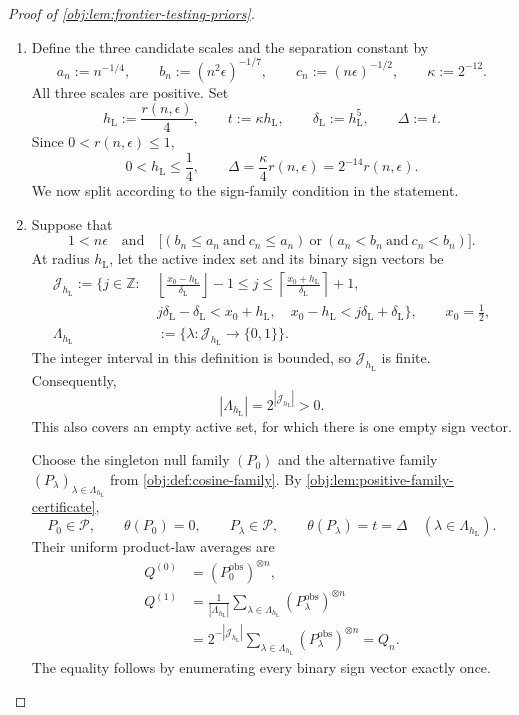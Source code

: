 \begin{proof}[Proof of \cref{obj:lem:frontier-testing-priors}]
\begin{enumerate}
\item Define the three candidate scales and the separation constant by
\[
a_n:=n^{-1/4},\qquad
b_n:=(n^2\epsilon)^{-1/7},\qquad
c_n:=(n\epsilon)^{-1/2},\qquad
\kappa:=2^{-12}.
\]
All three scales are positive. Set
\[
h_{\mathrm L}:=\frac{r(n,\epsilon)}4,\qquad
t:=\kappa h_{\mathrm L},\qquad
\delta_{\mathrm L}:=h_{\mathrm L}^{5},\qquad
\Delta:=t.
\]
Since \(0<r(n,\epsilon)\le1\),
\[
0<h_{\mathrm L}\le\frac14,
\qquad
\Delta=\frac{\kappa}{4}r(n,\epsilon)
      =2^{-14}r(n,\epsilon).
\]
We now split according to the sign-family condition in the statement.

\item Suppose that
\[
1<n\epsilon
\quad\text{and}\quad
\bigl[(b_n\le a_n\ \text{and}\ c_n\le a_n)
\ \text{or}\
(a_n<b_n\ \text{and}\ c_n<b_n)\bigr].
\]
At radius \(h_{\mathrm L}\), let the active index set and its binary sign vectors be
\[
\begin{aligned}
\mathcal J_{h_{\mathrm L}}
:=\biggl\{j\in\mathbb Z:\;&
\left\lfloor\frac{x_0-h_{\mathrm L}}{\delta_{\mathrm L}}\right\rfloor-1
\le j\le
\left\lceil\frac{x_0+h_{\mathrm L}}{\delta_{\mathrm L}}\right\rceil+1,\\
&j\delta_{\mathrm L}-\delta_{\mathrm L}<x_0+h_{\mathrm L},
\quad
x_0-h_{\mathrm L}<j\delta_{\mathrm L}+\delta_{\mathrm L}
\biggr\},
\qquad x_0=\frac12,\\
\Lambda_{h_{\mathrm L}}&:=\{\lambda:\mathcal J_{h_{\mathrm L}}\to\{0,1\}\}.
\end{aligned}
\]
The integer interval in this definition is bounded, so \(\mathcal J_{h_{\mathrm L}}\) is finite. Consequently,
\[
|\Lambda_{h_{\mathrm L}}|=2^{|\mathcal J_{h_{\mathrm L}}|}>0.
\]
This also covers an empty active set, for which there is one empty sign vector.

Choose the singleton null family \((P_0)\) and the alternative family
\((P_\lambda)_{\lambda\in\Lambda_{h_{\mathrm L}}}\) from
\cref{obj:def:cosine-family}. By
\cref{obj:lem:positive-family-certificate},
\[
P_0\in\mathcal P,\qquad \theta(P_0)=0,\qquad
P_\lambda\in\mathcal P,\qquad \theta(P_\lambda)=t=\Delta
\quad(\lambda\in\Lambda_{h_{\mathrm L}}).
\]
Their uniform product-law averages are
\[
\begin{aligned}
Q^{(0)}&=(P_0^{\mathrm{obs}})^{\otimes n},\\
Q^{(1)}
&=\frac1{|\Lambda_{h_{\mathrm L}}|}
  \sum_{\lambda\in\Lambda_{h_{\mathrm L}}}
  (P_\lambda^{\mathrm{obs}})^{\otimes n}\\
&=2^{-|\mathcal J_{h_{\mathrm L}}|}
  \sum_{\lambda\in\Lambda_{h_{\mathrm L}}}
  (P_\lambda^{\mathrm{obs}})^{\otimes n}
 =Q_n.
\end{aligned}
\]
The equality follows by enumerating every binary sign vector exactly once.


\end{enumerate}
\end{proof}
